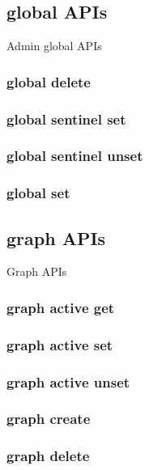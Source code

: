 \subsection{global APIs}

Admin global APIs

\subsubsection{global delete}

\subsubsection{global sentinel set}

\subsubsection{global sentinel unset}

\subsubsection{global set}

\subsection{graph APIs}

Graph APIs

\subsubsection{graph active get}

\subsubsection{graph active set}

\subsubsection{graph active unset}

\subsubsection{graph create}

\subsubsection{graph delete}


